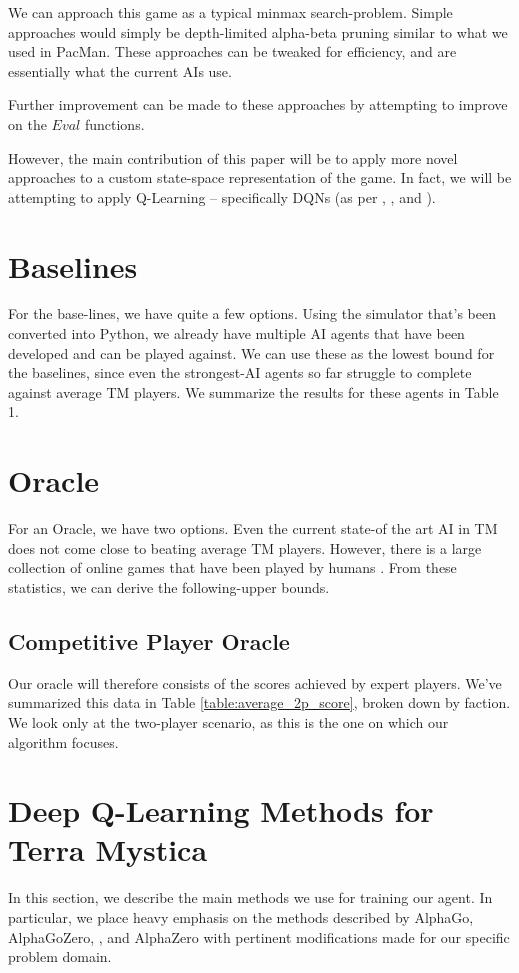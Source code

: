 \documentclass[10pt,twocolumn,letterpaper]{article}
\begin{document}
We can approach this game as a typical minmax search-problem. Simple approaches would simply be depth-limited alpha-beta pruning similar to what we used in PacMan. These approaches can be tweaked for efficiency, and are essentially what the current AIs use.

Further improvement can be made to these approaches by attempting to improve on the $Eval$ functions.

However, the main contribution of this paper will be to apply more novel approaches to a custom state-space representation of the game. In fact, we will be attempting to apply Q-Learning -- specifically DQNs (as per \cite{AlphaGo}, \cite{AlphaGoZero}, and \cite{AlphaZero}). 

\section{Baselines}
For the base-lines, we have quite a few options. Using the simulator that's been converted into Python, we already have multiple AI agents that have been developed and can be played against. We can use these as the lowest bound for the baselines, since even the strongest-AI agents so far struggle to complete against average TM players. We summarize the results for these agents in Table 1.

\section{Oracle}
For an Oracle, we have two options. Even the current state-of the art AI in TM does not come close to beating average TM players. However, there is a large collection of online games that have been played by humans \cite{TMStats}. From these statistics, we can derive the following-upper bounds.

\subsection{Competitive Player Oracle}
Our oracle will therefore consists of the scores achieved by expert players. We've summarized this data in Table \ref{table:average_2p_score}, broken down by faction. We look only at the two-player scenario, as this is the one on which our algorithm focuses.

\section{Deep Q-Learning Methods for Terra Mystica}
In this section, we describe the main methods we use for training our agent. In particular, we place heavy emphasis on the methods described by AlphaGo\cite{AlphaGo}, AlphaGoZero, \cite{AlphaGoZero}, and AlphaZero \cite{AlphaZero} with pertinent modifications made for our specific problem domain.
\end{document}
